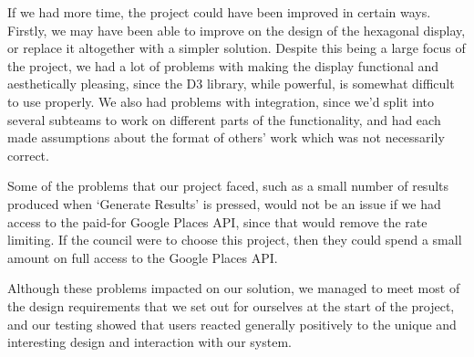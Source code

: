 \documentclass[10pt,a4paper]{article}
\begin{document}
If we had more time, the project could have been improved in certain ways. Firstly, we may have been able to improve on the design of the hexagonal display, or replace it altogether with a simpler solution. Despite this being a large focus of the project, we had a lot of problems with making the display functional and aesthetically pleasing, since the D3 library, while powerful, is somewhat difficult to use properly. We also had problems with integration, since we’d split into several subteams to work on different parts of the functionality, and had each made assumptions about the format of others’ work which was not necessarily correct.

Some of the problems that our project faced, such as a small number of results produced when ‘Generate Results’ is pressed, would not be an issue if we had access to the paid-for Google Places API, since that would remove the rate limiting. If the council were to choose this project, then they could spend a small amount on full access to the Google Places API.

Although these problems impacted on our solution, we managed to meet most of the design requirements that we set out for ourselves at the start of the project, and our testing showed that users reacted generally positively to the unique and interesting design and interaction with our system. 
\end{document}
